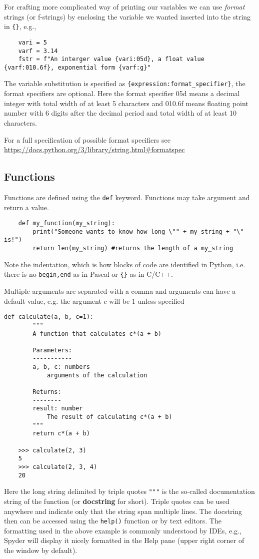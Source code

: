 For crafting more complicated way of printing our variables we can use \emph{format} strings (or f-strings) by enclosing the variable we wanted inserted into the string in \verb|{}|, e.g.,
\begin{lstlisting}
    vari = 5
    varf = 3.14
    fstr = f"An interger value {vari:05d}, a float value {varf:010.6f}, exponential form {varf:g}"
\end{lstlisting}
The variable substitution is specified as \verb|{expression:format_specifier}|, the format specifiers are optional. Here the format specifier 05d means a decimal integer with total width of at least 5 characters and 010.6f means floating point number with 6 digits after the decimal period and total width of at least 10 characters.

For a full specification of possible format specifiers see \url{https://docs.python.org/3/library/string.html#formatspec}

\subsection{Functions}
Functions are defined using the \verb|def| keyword. Functions may take argument and return a value.
\begin{lstlisting}
    def my_function(my_string):
        print("Someone wants to know how long \"" + my_string + "\" is!")
        return len(my_string) #returns the length of a my_string
\end{lstlisting}
Note the indentation, which is how blocks of code are identified in Python, i.e. there is no \verb|begin,end| as in Pascal or \verb|{}| as in C/C++.

Multiple arguments are separated with a comma and arguments can have a default value, e.g. the argument $c$ will be 1 unless specified
\begin{lstlisting}[caption=Function definition]
    def calculate(a, b, c=1):
        """
        A function that calculates c*(a + b)

        Parameters:
        -----------
        a, b, c: numbers
            arguments of the calculation

        Returns:
        --------
        result: number
            The result of calculating c*(a + b)
        """
        return c*(a + b)

    >>> calculate(2, 3)
    5
    >>> calculate(2, 3, 4)
    20
\end{lstlisting}
Here the long string delimited by triple quotes \lstinline{"""} is the so-called documentation string of the function (or \textbf{docstring} for short). Triple quotes can be used anywhere and indicate only that the string span multiple lines. The docstring then can be accessed using the \lstinline{help()} function or by text editors. The formatting used in the above example is commonly understood by IDEs, e.g., Spyder will display it nicely formatted in the Help pane (upper right corner of the window by default).

